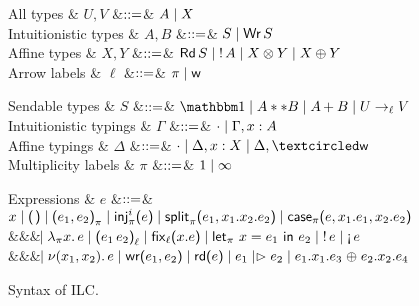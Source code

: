 \begin{figure*}[t]
  \centering
  \begin{minipage}{.475\textwidth}
    \centering
    \begin{grammar}
        All types
      & $U, V$
        &$\mathrel{::=}$& $A \mathrel{\mid} X$
      \\      
      Intuitionistic types
      & $A,B$
      &$\mathrel{::=}$& $S \mathrel{\mid} \text{\textsf{Wr}}\,S$
      \\
      Affine types
      & $X,Y$
      &$\mathrel{::=}$& $\text{\textsf{Rd}}\,S \mathrel{\mid} {!}\,{A} \mathrel{\mid}
      {X}\otimes{Y} \mathrel{\mid} {X}\oplus{Y}$
      \\
      Arrow labels
      & $\ell$
      &$\mathrel{::=}$& $\pi \mathrel{\mid} \textsf{w}$
    \end{grammar}
  \end{minipage}%
  \begin{minipage}{.475\textwidth}
    \centering
    \begin{grammar}
      Sendable types
      & $S$
      &$\mathrel{::=}$& $\tyUnit \bnfalt A ** B \bnfalt \tySum{A}{}{B} \bnfalt \tyArr{U}{\ell}{V}$              
      \\
      Intuitionistic typings
      & $\Gamma$
      &$\mathrel{::=}$& $\cdot \mathrel{\mid} \Gamma,x:A$
      \\
      Affine typings
      & $\Delta$
      &$\mathrel{::=}$& $\emptyctxt \bnfalt \Delta,x:X \bnfalt \Delta, \wrtok$
      \\            
      Multiplicity labels
      & $\pi$
      &$\mathrel{::=}$& $1 \mathrel{\mid} \infty$
    \end{grammar}
  \end{minipage}
  \begin{grammar}
    Expressions
    & $e$
    &$\mathrel{::=}$&
    $\eVar{x} \bnfalt \eUnit \bnfalt \ePair{e_1}{e_2}{\pi} \bnfalt \eInj{i}{e}
    \bnfalt \eSplit{e_1}{x_1}{x_2}{e_2} \bnfalt
    \eCase{\pi}{e}{x_1}{e_1}{x_2}{e_2}$
    \\ &&& $\hspace{-1.02ex}\mathrel{\mid} \lambda_{\pi} {x}.\,{e} \mathrel{\mid} \textsf{(} e_1\,e_2\textsf{)}_{\ell} \mathrel{\mid} \text{\textsf{fix}}_{\ell}\textsf{(}{x}.{e}\textsf{)}
    \mathrel{\mid} \text{\textsf{let}}_{\pi}\ {x} = {e_1}\ \text{\textsf{in}}\ {e_2} \mathrel{\mid} {!}\,{e} \mathrel{\mid} \textnormal{!`}\,{e}$
    \\ &&& $\hspace{-1.02ex}\mathrel{\mid} \nu(x_1,x_2).\,e \mathrel{\mid} \text{\textsf{wr}}\textsf{(}{e_1},{e_2}\textsf{)}
    \mathrel{\mid} \text{\textsf{rd}}\textsf{(}{e}\textsf{)} \mathrel{\mid} e_1 \mathrel{|\rhd} e_2 \mathrel{\mid} {e_1}.{x_1}.{e_3} \mathrel{\oplus} {e_2}.{x_2}.{e_4}$
  \end{grammar}      
  \caption{Syntax of ILC.}
  \label{fig:ilc-syntax}
\end{figure*}
